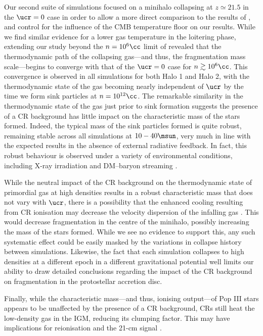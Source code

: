 Our second suite of simulations focused on a minihalo collapsing at $z\simeq21.5$ in the $\ucr=0$ case in order to allow a more direct comparison to the results of \citet{StacyBromm2007}, and control for the influence of the CMB temperature floor on our results.
While we find similar evidence for a lower gas temperature in the loitering phase, extending our study beyond the $n=10^6\cc$ limit of \citet{StacyBromm2007} revealed that the thermodynamic path of the collapsing gas---and thus, the fragmentation mass scale---begins to converge with that of the $\ucr=0$ case for $n\gtrsim10^6\cc$.  
This convergence is observed in all simulations for both Halo 1 and Halo 2, with the thermodynamic state of the gas becoming nearly independent of $\ucr$ by the time we form sink particles at $n=10^{12}\cc$.
The remarkable similarity in the thermodynamic state of the gas just prior to sink formation suggests the presence of a CR background has little impact on the characteristic mass of the stars formed.  
Indeed, the typical mass of the sink particles formed is quite robust, remaining stable across all simulations at $10-40\msun$, very much in line with the expected results in the absence of external radiative feedback. In fact, this robust behaviour is observed under a variety of environmental conditions, including X-ray irradiation \citep{Hummeletal2015} and DM--baryon streaming \citep{StacyBrommLoeb2011a,Greifetal2011b}.

While the neutral impact of the CR background on the thermodynamic state of primordial gas at high densities results in a robust characteristic mass that does not vary with $\ucr$, there is a possibility that the enhanced cooling resulting from CR ionisation may decrease the velocity dispersion of the infalling gas \citep{Clarketal2011a}.  
This would decrease fragmentation in the centre of the minihalo, possibly increasing the mass of the stars formed.
While we see no evidence to support this, any such systematic effect could be easily masked by the variations in collapse history between simulations.  
Likewise, the fact that each simulation collapses to high densities at a different epoch in a different gravitational potential well limits our ability to draw detailed conclusions regarding the impact of the CR background on fragmentation in the protostellar accretion disc.

Finally, while the characteristic mass---and thus, ionising output---of Pop III stars appears to be unaffected by the presence of a CR background, CRs still heat the low-density gas in the IGM, reducing its clumping factor. This may have implications for reionisation and the 21-cm signal \citep{FurlanettoPengBriggs2006, SazonovSunyaev2015}.